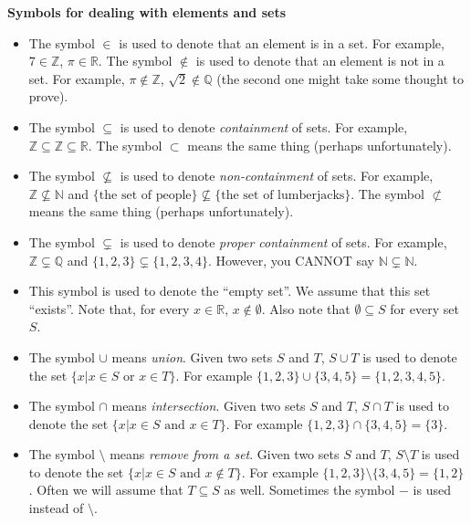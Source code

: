 \documentclass[11pt]{amsart}
\newcommand{\bR}{\mathbb{R}}
\newcommand{\bN}{\mathbb{N}}
\newcommand{\bQ}{\mathbb{Q}}
\newcommand{\bZ}{\mathbb{Z}}
\newcommand{\nsubset}{\not\subset}
\theoremstyle{definition}
\theoremstyle{remark}
\begin{document}
{\bf Symbols for dealing with elements and sets}
\begin{itemize}
 \item[$\in, \notin$]  The symbol $\in$ is used to denote that an element is in a set.  For example, $7 \in \bZ$, $\pi \in \bR$.  The symbol $\notin$ is used to denote that an element is not in a set.  For example, $\pi \notin \bZ$, $\sqrt{2} \notin \bQ$ (the second one might take some thought to prove).  
 \item[$\subseteq$]  The symbol $\subseteq$ is used to denote \emph{containment} of sets.  For example, $\bZ \subseteq \bZ \subseteq \bR$. The symbol $\subset$ means the same thing (perhaps unfortunately).
 \item[$\nsubseteq$]  The symbol $\nsubseteq$ is used to denote \emph{non-containment} of sets.  For example, $\bZ \nsubseteq \bN$ and $\{\text{the set of people}\} \nsubseteq \{\text{the set of lumberjacks}\}$.  The symbol $\nsubset$ means the same thing (perhaps unfortunately).  
 \item[$\subsetneq$]  The symbol $\subsetneq$ is used to denote \emph{proper containment} of sets.  For example, $\bZ \subsetneq \bQ$ and $\{1,2,3\} \subsetneq \{1,2,3,4\}$.  However, you CANNOT say $\bN \subsetneq \bN$.  
\item[$\emptyset$]  This symbol is used to denote the ``empty set''.  We assume that this set ``exists''.  Note that, for every $x \in \bR$, $x \notin \emptyset$.  Also note that $\emptyset \subseteq S$ for every set $S$.  
\item[$\cup$]  The symbol $\cup$ means \emph{union}.  Given two sets $S$ and $T$, $S \cup T$ is used to denote the set $\{ x | x \in S \text{ or } x \in T\}$.  For example $\{1,2,3\} \cup \{3,4,5\} = \{1,2,3,4,5\}$.
\item[$\cap$]  The symbol $\cap$ means \emph{intersection}.  Given two sets $S$ and $T$, $S \cap T$ is used to denote the set $\{ x | x \in S \text{ and } x \in T\}$.  For example $\{1,2,3\} \cap \{3,4,5\} = \{3\}$.
\item[$\setminus$]  The symbol $\setminus$ means \emph{remove from a set}.  Given two sets $S$ and $T$, $S \setminus T$ is used to denote the set $\{ x | x \in S \text{ and } x \notin T\}$.  For example $\{1,2,3\} \setminus \{3,4,5\} = \{1,2\}$.  Often we will assume that $T \subseteq S$ as well.   Sometimes the symbol $-$ is used instead of $\setminus$.  
\end{itemize}
\end{document}
